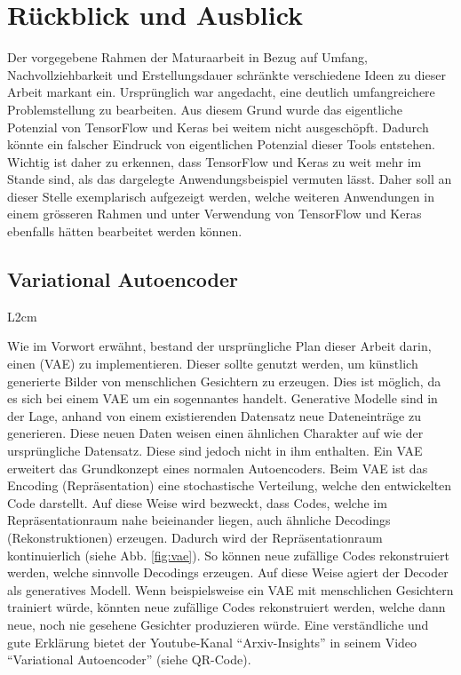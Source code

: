 \chapter*{Rückblick und Ausblick}

Der vorgegebene Rahmen der Maturaarbeit in Bezug auf Umfang,
Nachvollziehbarkeit und Erstellungsdauer schränkte verschiedene Ideen zu dieser
Arbeit markant ein. Ursprünglich war angedacht, eine deutlich umfangreichere
Problemstellung zu bearbeiten. Aus diesem Grund wurde das eigentliche Potenzial von
TensorFlow und Keras bei weitem nicht ausgeschöpft. Dadurch könnte ein falscher
Eindruck von eigentlichen Potenzial dieser Tools entstehen. Wichtig ist daher zu
erkennen, dass TensorFlow und Keras zu weit mehr im Stande sind, als das
dargelegte Anwendungsbeispiel vermuten lässt.
\para{}
Daher soll an dieser Stelle exemplarisch aufgezeigt werden, welche
weiteren Anwendungen in einem grösseren Rahmen und unter Verwendung von
TensorFlow und Keras ebenfalls hätten bearbeitet werden können.

\section*{Variational Autoencoder}
\begin{wrapfigure}{L}{2cm}
\end{wrapfigure}
Wie im Vorwort erwähnt, bestand der ursprüngliche Plan dieser Arbeit
darin, einen  (VAE) zu implementieren. Dieser sollte genutzt werden,
um künstlich generierte Bilder von menschlichen Gesichtern zu erzeugen.
Dies ist möglich, da es sich bei einem VAE um ein sogennantes
 handelt.
\para{}
Generative Modelle sind in der Lage, anhand
von einem existierenden Datensatz neue Dateneinträge zu generieren. Diese neuen Daten
weisen einen ähnlichen Charakter auf wie der ursprüngliche Datensatz. Diese sind
jedoch nicht in ihm enthalten.
\para{}
Ein VAE erweitert das Grundkonzept eines normalen Autoencoders. Beim VAE ist das
Encoding (Repräsentation) eine stochastische Verteilung, welche den entwickelten
Code darstellt.
Auf diese Weise wird bezweckt, dass Codes, welche im Repräsentationraum nahe beieinander liegen, auch ähnliche
Decodings (Rekonstruktionen) erzeugen. Dadurch wird der Repräsentationraum
kontinuierlich (siehe Abb. \ref{fig:vae}). So können neue zufällige Codes
rekonstruiert werden, welche sinnvolle Decodings erzeugen. Auf diese Weise agiert der Decoder als generatives
Modell. Wenn beispielsweise ein VAE mit menschlichen Gesichtern
trainiert würde, könnten neue zufällige Codes rekonstruiert werden, welche dann
neue, noch nie gesehene Gesichter produzieren würde.
\para{}
Eine verständliche und gute Erklärung bietet der Youtube-Kanal
``Arxiv-Insights'' in seinem Video ``Variational Autoencoder'' (siehe QR-Code).

